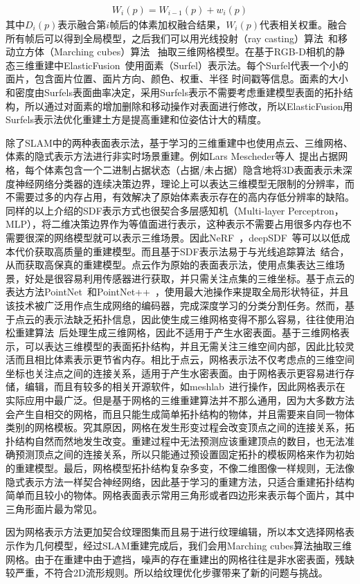 \begin{align} 
W_{i}(p)=W_{i-1}(p)+w_{i}(p)
\end{align}
其中$D_i(p)$表示融合第$i$帧后的体素加权融合结果，$W_i(p)$代表相关权重。融合所有帧后可以得到全局模型，之后我们可以用光线投射（ray casting）算法~\cite{511}和移动立方体（Marching cubes）算法~\cite{lorensen1987marching} 抽取三维网格模型。在基于RGB-D相机的静态三维重建中ElasticFusion~\cite{ThomasWhelan2015ElasticFusionDS}使用面素（Surfel）表示法。每个Surfel代表一个小的面片，包含面片位置、面片方向、颜色、权重、半径
时间戳等信息。面素的大小和密度由Surfels表面曲率决定，采用Surfels表示不需要考虑重建模型表面的拓扑结构，所以通过对面素的增加删除和移动操作对表面进行修改，所以ElasticFusion用Surfels表示法优化重建土方是提高重建和位姿估计大的精度。\par
除了SLAM中的两种表面表示法，基于学习的三维重建中也使用点云、三维网格、体素的隐式表示方法进行非实时场景重建。例如Lars Mescheder等人~\cite{LarsMescheder2018OccupancyNL}提出占据网格，每个体素包含一个二进制占据状态（占据/未占据）隐含地将3D表面表示未深度神经网络分类器的连续决策边界，理论上可以表达三维模型无限制的分辨率，而不需要过多的内存占用，有效解决了原始体素表示存在的高内存低分辨率的缺陷。同样的以上介绍的SDF表示方式也很契合多层感知机（Multi-layer Perceptron，MLP），将二维决策边界作为等值面进行表示，这种表示不需要占用很多内存也不需要很深的网络模型就可以表示三维场景。因此NeRF~\cite{mildenhall2021nerf}，deepSDF~\cite{park2019deepsdf}等可以以低成本代价获取高质量的重建模型。而且基于SDF表示法易于与光线追踪算法~\cite{hart1996sphere}结合，从而获取高保真的重建模型。点云作为原始的表面表示法，使用点集表达三维场景，好处是很容易利用传感器进行获取，并只需关注点集的三维坐标。基于点云的表达方法PointNet~\cite{qi2017pointnet}和PointNet++~\cite{qi2017pointnet++}，使用最大池操作来提取全局形状特征，并且该技术被广泛用作点生成网络的编码器，完成深度学习的分类分割任务。然而，基于点云的表示法缺乏拓扑信息，因此使生成三维网格变得不那么容易，往往使用泊松重建算法~\cite{kazhdan2006poisson}后处理生成三维网格，因此不适用于产生水密表面。基于三维网格表示，可以表达三维模型的表面拓扑结构，并且无需关注三维空间内部，因此比较灵活而且相比体素表示更节省内存。相比于点云，网格表示法不仅考虑点的三维空间坐标也关注点之间的连接关系，适用于产生水密表面。由于网格表示更容易进行存储，编辑，而且有较多的相关开源软件，如meshlab~\cite{LocalChapterEvents:ItalChap:ItalianChapConf2008:129-136}进行操作，因此网格表示在实际应用中最广泛。但是基于网格的三维重建算法并不那么通用，因为大多数方法会产生自相交的网格，而且只能生成简单拓扑结构的物体，并且需要来自同一物体类别的网格模板。究其原因，网格在发生形变过程会改变顶点之间的连接关系，拓扑结构自然而然地发生改变。重建过程中无法预测应该重建顶点的数目，也无法准确预测顶点之间的连接关系，所以只能通过预设置固定拓扑的模板网格来作为初始的重建模型。最后，网格模型拓扑结构复杂多变，不像二维图像一样规则，无法像隐式表示方法一样契合神经网络，因此基于学习的重建方法，只适合重建拓扑结构简单而且较小的物体。网格表面表示常用三角形或者四边形来表示每个面片，其中三角形面片最为常见。\par
因为网格表示方法更加契合纹理图集而且易于进行纹理编辑，所以本文选择网格表示作为几何模型，经过SLAM重建完成后，我们会用Marching cubes算法抽取三维网格。由于在重建中由于遮挡，噪声的存在重建出的网格往往是非水密表面，残缺较严重，不符合2D流形规则。所以给纹理优化步骤带来了新的问题与挑战。

